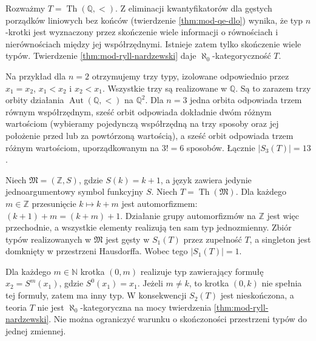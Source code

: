 \begin{przyklad}
\label{ex:mod-rn-dlo}
Rozważmy $T=\operatorname{Th}(\mathbb Q,<)$.
Z eliminacji kwantyfikatorów dla gęstych
porządków liniowych bez końców
(twierdzenie \ref{thm:mod-qe-dlo}) wynika,
że typ $n$-krotki jest wyznaczony przez
skończenie wiele informacji o równościach
i nierównościach między jej współrzędnymi.
Istnieje zatem tylko skończenie wiele typów.
Twierdzenie \ref{thm:mod-ryll-nardzewski}
daje $\aleph_0$-kategoryczność $T$.

Na przykład dla $n=2$ otrzymujemy trzy typy,
izolowane odpowiednio przez $x_1=x_2$,
$x_1<x_2$ i $x_2<x_1$. Wszystkie trzy
są realizowane w $\mathbb Q$.
Są to zarazem trzy orbity działania
$\operatorname{Aut}(\mathbb Q,<)$ na $\mathbb Q^2$.
Dla $n=3$ jedna orbita odpowiada trzem
równym współrzędnym, sześć orbit odpowiada
dokładnie dwóm różnym wartościom
(wybieramy pojedynczą współrzędną na trzy
sposoby oraz jej położenie przed lub za
powtórzoną wartością), a sześć orbit
odpowiada trzem różnym wartościom,
uporządkowanym na $3!=6$ sposobów.
Łącznie $|S_3(T)|=13$.
\end{przyklad}

\begin{przyklad}
\label{ex:mod-rn-one-type-insufficient}
Niech $\mathfrak M=(\mathbb Z,S)$, gdzie
$S(k)=k+1$, a język zawiera jedynie
jednoargumentowy symbol funkcyjny $S$.
Niech $T=\operatorname{Th}(\mathfrak M)$.
Dla każdego $m\in\mathbb Z$ przesunięcie
$k\mapsto k+m$ jest automorfizmem:
$(k+1)+m=(k+m)+1$. Działanie grupy
automorfizmów na $\mathbb Z$ jest więc
przechodnie, a wszystkie elementy
realizują ten sam typ jednozmienny.
Zbiór typów realizowanych w $\mathfrak M$
jest gęsty w $S_1(T)$ przez zupełność $T$,
a singleton jest domknięty w przestrzeni
Hausdorffa. Wobec tego $|S_1(T)|=1$.

Dla każdego $m\in\mathbb N$ krotka $(0,m)$
realizuje typ zawierający formułę
$x_2=S^m(x_1)$, gdzie $S^0(x_1)=x_1$.
Jeżeli $m\ne k$, to krotka $(0,k)$
nie spełnia tej formuły, zatem ma inny typ.
W konsekwencji $S_2(T)$ jest nieskończona,
a teoria $T$ nie jest $\aleph_0$-kategoryczna
na mocy twierdzenia \ref{thm:mod-ryll-nardzewski}.
Nie można ograniczyć warunku o skończoności
przestrzeni typów do jednej zmiennej.
\end{przyklad}

